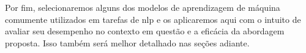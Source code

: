 Por fim, selecionaremos alguns dos modelos de aprendizagem de máquina comumente utilizados em tarefas de \acrshort{nlp} e os aplicaremos aqui com o intuito de avaliar seu desempenho no contexto em questão e a eficácia da abordagem proposta. Isso também será melhor detalhado nas seções adiante.


















